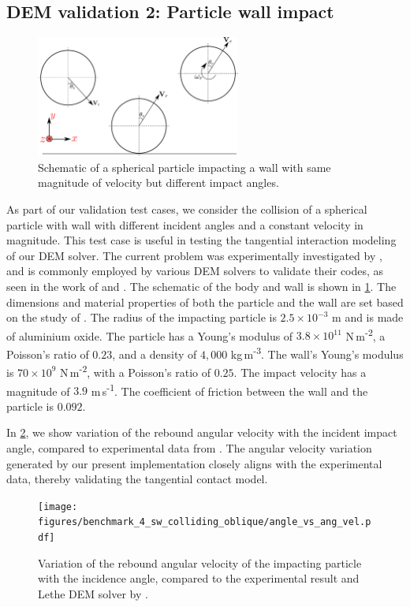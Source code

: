 \documentclass[preprint,12pt]{elsarticle}
\begin{document}
\subsection{DEM validation 2: Particle wall impact}
\label{sec:DEM_validation_2_particle_wall_impact}
\begin{figure}[!htpb]
  \centering
  \includegraphics[width=0.6\textwidth]{images/results_dem_2_validation_particle_wall_impact/schematic}
  \caption{Schematic of a spherical particle impacting a wall
    with same magnitude of velocity but different impact angles.}
  \label{fig:result:dem_sw_contact_schematic}
\end{figure}
As part of our validation test cases, we consider the collision of a spherical
particle with wall with different incident angles and a constant velocity in
magnitude. This test case is useful in testing the tangential interaction
modeling of our DEM solver.  The current problem was experimentally
investigated by \citet{kharaz2001experimental}, and is commonly employed by
various DEM solvers to validate their codes, as seen in the work of
\cite{di2004comparison} and \cite{golshan2023lethe}.  The schematic of the
body and wall is shown in \cref{fig:result:dem_sw_contact_schematic}.
The dimensions and material properties of both the particle and the wall are
set based on the study of \cite{di2004comparison,kharaz2001experimental}. The
radius of the impacting particle is $2.5 \times 10^{-3}$ m and is made of aluminium
oxide. The particle has a Young's modulus of $3.8 \times 10^{11}$
N\,m\textsuperscript{-2}, a Poisson's ratio of $0.23$, and a density of $4,000$
kg\,m\textsuperscript{-3}. The wall's Young's modulus is $70\times 10^{9}$
N\,m\textsuperscript{-2}, with a Poisson's ratio of $0.25$.  The impact velocity
has a magnitude of $3.9$ m\,s\textsuperscript{-1}. The coefficient of friction
between the wall and the particle is $0.092$.


In \cref{fig:result:dem_sw_contact_omega_vs_theta}, we show variation of the
rebound angular velocity with the incident impact angle, compared to
experimental data from \citet{kharaz2001experimental}.  The angular velocity
variation generated by our present implementation closely aligns with the
experimental data, thereby validating the tangential
contact model.
\begin{figure}[!htpb]
  \centering
  \texttt{[image: figures/benchmark\_4\_sw\_colliding\_oblique/angle\_vs\_ang\_vel.pdf]}
  \caption{Variation of the rebound angular velocity of the impacting particle
    with the incidence angle, compared to the experimental result and Lethe
    DEM solver by \cite{golshan2023lethe}.}
  \label{fig:result:dem_sw_contact_omega_vs_theta}
\end{figure}
\end{document}
